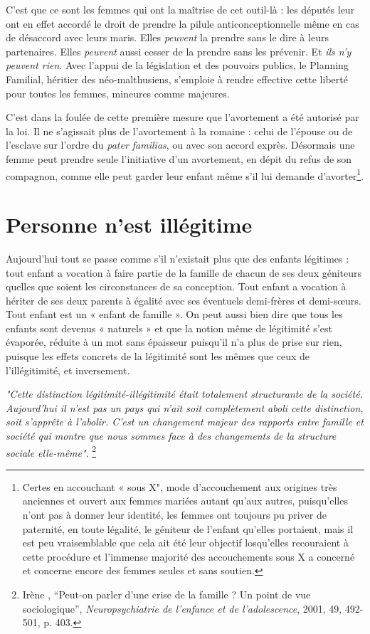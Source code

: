  C'est que ce sont les femmes qui ont la maîtrise de cet outil-là : les députés leur ont en effet accordé le droit de prendre la pilule anticonceptionnelle même en cas de désaccord avec leurs maris. Elles \emph{peuvent} la prendre sans le dire à leurs partenaires. Elles \emph{peuvent} aussi cesser de la prendre sans les prévenir. Et\emph{ ils n'y peuvent rien}. Avec l'appui de la législation et des pouvoirs publics, le Planning Familial, héritier des néo-malthusiens, s'emploie à rendre effective cette liberté pour toutes les femmes, mineures comme majeures. 

 C'est dans la foulée de cette première mesure que l'avortement a été autorisé par la loi. Il ne s'agissait plus de l'avortement à la romaine : celui de l'épouse ou de l'esclave sur l'ordre du \emph{pater familias}, ou avec son accord exprès. Désormais une femme peut prendre seule l'initiative d'un avortement, en dépit du refus de son compagnon, comme elle peut garder leur enfant même s'il lui demande d'avorter\footnote{Certes en accouchant « sous X",  mode d'accouchement aux origines très anciennes et ouvert aux femmes mariées autant qu'aux autres, puisqu'elles n'ont pas à donner leur identité, les femmes ont toujours pu priver de paternité, en toute légalité, le géniteur de l'enfant qu'elles portaient, mais il est peu vraisemblable que cela ait été leur objectif losqu'elles recouraient à cette procédure et l'immense majorité des accouchements sous X a concerné et concerne encore des femmes seules et sans soutien.}.
 
  \section{Personne n'est illégitime}
 
 Aujourd'hui tout se passe comme s'il n'existait plus que des enfants légitimes : tout enfant a vocation à faire partie de la famille de chacun de ses deux géniteurs quelles que soient les circonstances de sa conception. Tout enfant a vocation à hériter de ses deux parents à égalité avec ses éventuels demi-frères et demi-sœurs. Tout enfant est un « enfant de famille ». On peut aussi bien dire que tous les enfants sont devenus « naturels » et que la notion même de légitimité s'est évaporée, réduite à un mot sans épaisseur puisqu'il n'a plus de prise sur rien, puisque les effets concrets de la légitimité sont les mêmes que ceux de l'illégitimité, et inversement.
 \begin{displayquote}
\emph{"Cette distinction légitimité-illégitimité était totalement structurante de la société. Aujourd'hui il n'est pas un pays qui n'ait soit complètement aboli cette distinction, soit s'apprête à l'abolir. C'est un changement majeur des rapports entre famille et société qui montre que nous sommes face à des changements de la structure sociale elle-même"}.
\footnote{Irène , \enquote{Peut-on parler d'une crise de la famille ? Un point de vue sociologique}, \emph{Neuropsychiatrie de l'enfance et de l'adolescence}, 2001, 49, 492-501, p. 403.}%
\end{displayquote}

